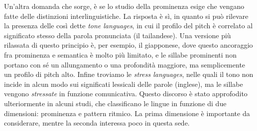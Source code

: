 \documentclass[twoside,twocolumn,10pt]{extarticle}
\theoremstyle{definition}
\begin{document}
	Un'altra domanda che sorge, è se lo studio della prominenza esige che vengano fatte delle distinzioni interlinguistiche. La risposta è sì, in quanto si può rilevare la presenza delle così dette \textit{tone languages}, in cui il profilo del pitch è correlato al significato stesso della parola pronunciata (il tailandese). Una versione più rilassata di questo principio è, per esempio, il giapponese, dove questo ancoraggio fra prominenza e semantica è molto più limitato, e le sillabe prominenti non portano con sé un allungamento o una profondità maggiore, ma semplicemente un profilo di pitch alto. Infine troviamo le \textit{stress languages}, nelle quali il tono non incide in alcun modo sui significati lessicali delle parole (inglese), ma le sillabe vengono \textit{stressate} in funzione comunicativa. Questo discorso è stato approfodito ulteriormente in alcuni studi, che classificano le lingue in funzione di due dimensioni: prominenza e pattern ritmico. La prima dimensione è importante da considerare, mentre la seconda interessa poco in questa sede.
\end{document}

